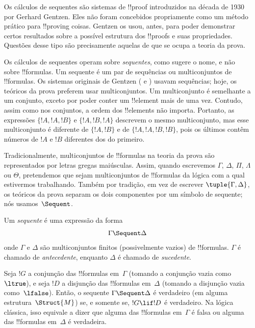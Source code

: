 \documentclass[../../../include/open-logic-section]{subfiles}
\begin{document}


Os cálculos de sequentes são sistemas de !!{proof} introduzidos na década
de 1930 por Gerhard Gentzen. Eles não foram concebidos propriamente como um
método prático para !!{proving} coisas. Gentzen os usou, antes, para poder
demonstrar certos resultados sobre a possível estrutura dos !!{proof}s e
suas propriedades. Questões desse tipo são precisamente aquelas de que se
ocupa a teoria da prova.

Os cálculos de sequentes operam sobre \emph{sequentes}, como sugere o nome,
e não sobre !!{formula}s. Um sequente é um par de sequências ou
multiconjuntos de !!{formula}s. Os sistemas originais de Gentzen (
e ) usavam sequências; hoje, os teóricos da prova preferem usar
multiconjuntos. Um multiconjunto é semelhante a um conjunto, exceto por
poder conter um !!{element} mais de uma vez. Contudo, assim como nos
conjuntos, a ordem dos !!{element}s não importa. Portanto, as expressões
$\{!A, !A, !B\}$ e $\{!A, !B, !A\}$ descrevem o mesmo multiconjunto, mas
esse multiconjunto é diferente de $\{!A, !B\}$ e de $\{!A, !A, !B, !B\}$,
pois os últimos contêm números de $!A$ e $!B$ diferentes dos do primeiro.

Tradicionalmente, multiconjuntos de !!{formula}s na teoria da prova são
representados por letras gregas maiúsculas. Assim, quando escrevemos
$\Gamma$, $\Delta$, $\Pi$, $\Lambda$ ou $\Theta$, pretendemos que sejam
multiconjuntos de !!{formula}s da lógica com a qual estivermos trabalhando.
Também por tradição, em vez de escrever $\tuple{\Gamma, \Delta}$, os
teóricos da prova separam os dois componentes por um símbolo de sequente;
nós usamos~$\Sequent$. 

\begin{defn}[Sequent]
Um \emph{sequente} é uma expressão da forma
\[
\Gamma \Sequent \Delta
\]
onde $\Gamma$ e $\Delta$ são multiconjuntos finitos (possivelmente vazios)
de !!{formula}s. $\Gamma$ é chamado de \emph{antecedente}, enquanto
$\Delta$ é chamado de \emph{sucedente}.
\end{defn}

Seja $!G$ a conjunção das !!{formula}s em~$\Gamma$ (tomando a conjunção
vazia como~$\ltrue$), e seja $!D$ a disjunção das !!{formula}s em~$\Delta$
(tomando a disjunção vazia como~$\lfalse$). Então, o sequente
$\Gamma \Sequent \Delta$ é verdadeiro (em alguma estrutura~$\Struct{M}$)
se, e somente se, $!G \lif !D$ é verdadeiro. Na lógica clássica, isso
equivale a dizer que alguma das !!{formula}s em~$\Gamma$ é falsa ou alguma
das !!{formula}s em~$\Delta$ é verdadeira.
\end{document}
